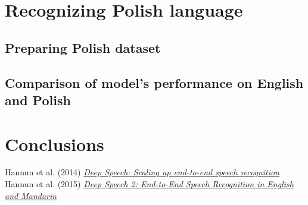 \documentclass[11pt,a4paper]{article}
\begin{document}
\newpage
\section{Recognizing Polish language}
\subsection{Preparing Polish dataset}
\subsection{Comparison of model's performance on English and Polish}

\newpage
\section{Conclusions}

\begin{thebibliography}{1}
   Hannun et al. (2014) \href{https://arxiv.org/pdf/1412.5567.pdf}{\em Deep Speech: Scaling up end-to-end speech recognition} 
   Hannun et al. (2015) \href{https://arxiv.org/abs/1512.02595}{\em Deep Speech 2: End-to-End Speech Recognition in English and Mandarin} 
\end{thebibliography}
  
\end{document}
